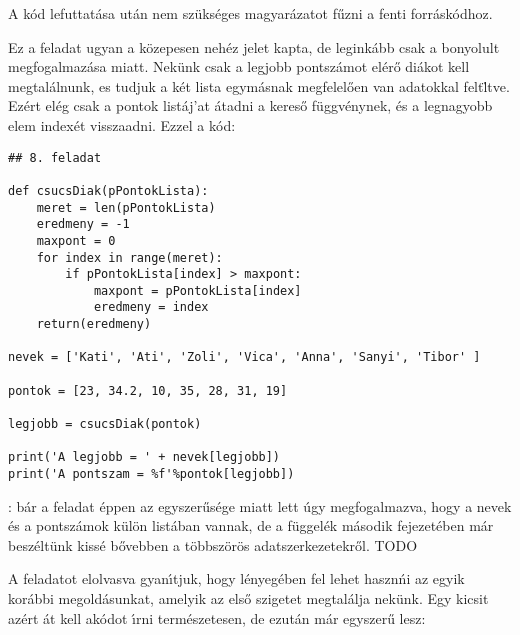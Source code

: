 A k\'od lefuttat\'asa ut\'an nem sz\"uks\'eges magyar\'azatot f\H{u}zni a fenti forr\'ask\'odhoz.

\themegold

Ez a feladat ugyan a k\"ozepesen neh\'ez jelet kapta, de legink\'abb csak a bonyolult megfogalmaz\'asa 
miatt. Nek\"unk csak a legjobb pontsz\'amot el\'er\H{o} di\'akot kell megtal\'alnunk, es tudjuk a k\'et 
lista egym\'asnak megfelel\H{o}en van adatokkal felt\"ltve. Ez\'ert el\'eg csak a pontok list\'aj'at 
\'atadni a keres\H{o} f\"uggv\'enynek, \'es a legnagyobb elem index\'et visszaadni. Ezzel a k\'od:

\begin{Verbatim}[fontsize=\small]
## 8. feladat

def csucsDiak(pPontokLista):
    meret = len(pPontokLista)
    eredmeny = -1
    maxpont = 0
    for index in range(meret):
        if pPontokLista[index] > maxpont:
            maxpont = pPontokLista[index]
            eredmeny = index
    return(eredmeny)

nevek = ['Kati', 'Ati', 'Zoli', 'Vica', 'Anna', 'Sanyi', 'Tibor' ]

pontok = [23, 34.2, 10, 35, 28, 31, 19]

legjobb = csucsDiak(pontok)

print('A legjobb = ' + nevek[legjobb])
print('A pontszam = %f'%pontok[legjobb])

\end{Verbatim}

: b\'ar a feladat \'eppen az egyszer\H{u}s\'ege miatt lett \'ugy megfogalmazva, 
hogy a nevek \'es a pontsz\'amok k\"ul\"on list\'aban vannak, de a f\"uggel\'ek m\'asodik fejezet\'eben 
m\'ar besz\'elt\"unk kiss\'e b\H{o}vebben a t\"obbsz\"or\"os adatszerkezetekr\H{o}l. TODO

\themegold

A feladatot elolvasva gyan\'{\i}tjuk, hogy l\'enyeg\'eben fel lehet haszn\'ni az egyik kor\'abbi 
megold\'asunkat, amelyik az els\H{o} szigetet megtal\'alja nek\"unk. Egy kicsit az\'ert \'at kell ak\'odot
\'{\i}rni term\'eszetesen, de ezut\'an m\'ar egyszer\H{u} lesz:

